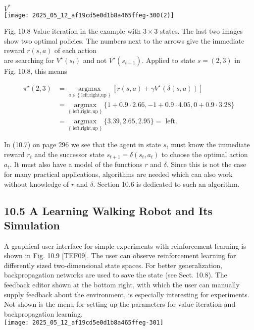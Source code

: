 \documentclass[10pt]{article}
\begin{document}
$V^{*}$\\
\texttt{[image: 2025\_05\_12\_af19cd5e0d1b8a465ffeg-300(2)]}

Fig. 10.8 Value iteration in the example with $3 \times 3$ states. The last two images show two optimal policies. The numbers next to the arrows give the immediate reward $r(s, a)$ of each action\\
are searching for $V^{\star}\left(s_{t}\right)$ and not $V^{\star}\left(s_{t+1}\right)$. Applied to state $s=(2,3)$ in Fig. 10.8, this means

$$
\begin{aligned}
\pi^{\star}(2,3) & =\underset{a \in\{\text { left,right,up }\}}{\operatorname{argmax}}\left[r(s, a)+\gamma V^{\star}(\delta(s, a))\right] \\
& =\underset{\{\text { left,right,up }\}}{\operatorname{argmax}}\{1+0.9 \cdot 2.66,-1+0.9 \cdot 4.05,0+0.9 \cdot 3.28\} \\
& =\underset{\{\text { left,right,up }\}}{\operatorname{argmax}}\{3.39,2.65,2.95\}=\text { left. }
\end{aligned}
$$

In (10.7) on page 296 we see that the agent in state $s_{t}$ must know the immediate reward $r_{t}$ and the successor state $s_{t+1}=\delta\left(s_{t}, a_{t}\right)$ to choose the optimal action $a_{t}$. It must also have a model of the functions $r$ and $\delta$. Since this is not the case for many practical applications, algorithms are needed which can also work without knowledge of $r$ and $\delta$. Section 10.6 is dedicated to such an algorithm.

\subsection*{10.5 A Learning Walking Robot and Its Simulation}
A graphical user interface for simple experiments with reinforcement learning is shown in Fig. 10.9 [TEF09]. The user can observe reinforcement learning for differently sized two-dimensional state spaces. For better generalization, backpropagation networks are used to save the state (see Sect. 10.8). The feedback editor shown at the bottom right, with which the user can manually supply feedback about the environment, is especially interesting for experiments. Not shown is the menu for setting up the parameters for value iteration and backpropagation learning.\\
\texttt{[image: 2025\_05\_12\_af19cd5e0d1b8a465ffeg-301]}
\end{document}

